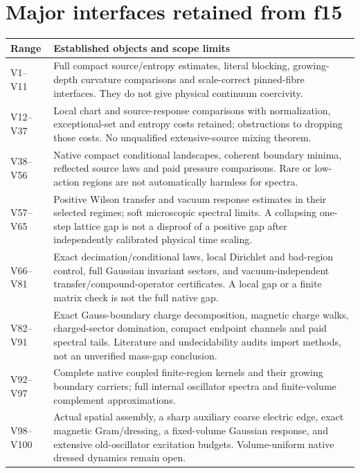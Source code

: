 \documentclass[11pt,oneside]{article}
\begin{document}
\section{Major interfaces retained from f15}
\label{f16v1:ledger}

\begin{center}\small
\begin{tabular}{@{}p{}p{}@{}}
\toprule
Range & Established objects and scope limits\\
\midrule
V1--V11 &
Full compact source/entropy estimates, literal blocking, growing-depth
curvature comparisons and scale-correct pinned-fibre interfaces.
They do not give physical continuum coercivity.\\[1mm]
V12--V37 &
Local chart and source-response comparisons with normalization,
exceptional-set and entropy costs retained; obstructions to dropping
those costs. No unqualified extensive-source mixing theorem.\\[1mm]
V38--V56 &
Native compact conditional landscapes, coherent boundary minima,
reflected source laws and paid pressure comparisons.
Rare or low-action regions are not automatically harmless for spectra.\\[1mm]
V57--V65 &
Positive Wilson transfer and vacuum response estimates in their
selected regimes; soft microscopic spectral limits.
A collapsing one-step lattice gap is not a disproof of a positive
gap after independently calibrated physical time scaling.\\[1mm]
V66--V81 &
Exact decimation/conditional laws, local Dirichlet and bad-region
control, full Gaussian invariant sectors, and vacuum-independent
transfer/compound-operator certificates.
A local gap or a finite matrix check is not the full native gap.\\[1mm]
V82--V91 &
Exact Gauss-boundary charge decomposition, magnetic charge walks,
charged-sector domination, compact endpoint channels and paid
spectral tails. Literature and undecidability audits import
methods, not an unverified mass-gap conclusion.\\[1mm]
V92--V97 &
Complete native coupled finite-region kernels and their growing
boundary carriers; full internal oscillator spectra and
finite-volume complement approximations.\\[1mm]
V98--V100 &
Actual spatial assembly, a sharp auxiliary coarse electric edge,
exact magnetic Gram/dressing, a fixed-volume Gaussian response,
and extensive old-oscillator excitation budgets.
Volume-uniform native dressed dynamics remain open.\\
\bottomrule
\end{tabular}
\end{center}
\end{document}
